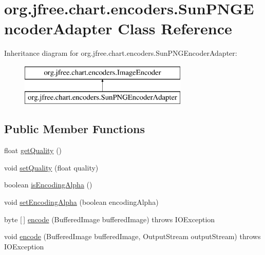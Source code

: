 \hypertarget{classorg_1_1jfree_1_1chart_1_1encoders_1_1_sun_p_n_g_encoder_adapter}{}\section{org.\+jfree.\+chart.\+encoders.\+Sun\+P\+N\+G\+Encoder\+Adapter Class Reference}
\label{classorg_1_1jfree_1_1chart_1_1encoders_1_1_sun_p_n_g_encoder_adapter}
Inheritance diagram for org.\+jfree.\+chart.\+encoders.\+Sun\+P\+N\+G\+Encoder\+Adapter\+:\begin{figure}[H]
\begin{center}
\leavevmode
\includegraphics[height=2.000000cm]{classorg_1_1jfree_1_1chart_1_1encoders_1_1_sun_p_n_g_encoder_adapter}
\end{center}
\end{figure}
\subsection*{Public Member Functions}
\begin{DoxyCompactItemize}
\item 
float \mbox{\hyperlink{classorg_1_1jfree_1_1chart_1_1encoders_1_1_sun_p_n_g_encoder_adapter_aa1012f037f19d693fec4e86da1d5f785}{get\+Quality}} ()
\item 
void \mbox{\hyperlink{classorg_1_1jfree_1_1chart_1_1encoders_1_1_sun_p_n_g_encoder_adapter_a1cb7ff32f553cea1eccd1767e3050bb9}{set\+Quality}} (float quality)
\item 
boolean \mbox{\hyperlink{classorg_1_1jfree_1_1chart_1_1encoders_1_1_sun_p_n_g_encoder_adapter_adc379d171449112333184b52e7292df8}{is\+Encoding\+Alpha}} ()
\item 
void \mbox{\hyperlink{classorg_1_1jfree_1_1chart_1_1encoders_1_1_sun_p_n_g_encoder_adapter_a105f0b1888336e8bd7b5716a05d1184a}{set\+Encoding\+Alpha}} (boolean encoding\+Alpha)
\item 
byte \mbox{[}$\,$\mbox{]} \mbox{\hyperlink{classorg_1_1jfree_1_1chart_1_1encoders_1_1_sun_p_n_g_encoder_adapter_aabba217aad5303766501a159dfae6b07}{encode}} (Buffered\+Image buffered\+Image)  throws I\+O\+Exception 
\item 
void \mbox{\hyperlink{classorg_1_1jfree_1_1chart_1_1encoders_1_1_sun_p_n_g_encoder_adapter_ad1bb8a4e33cc9a8b6b259c0955d807f1}{encode}} (Buffered\+Image buffered\+Image, Output\+Stream output\+Stream)  throws I\+O\+Exception 
\end{DoxyCompactItemize}


